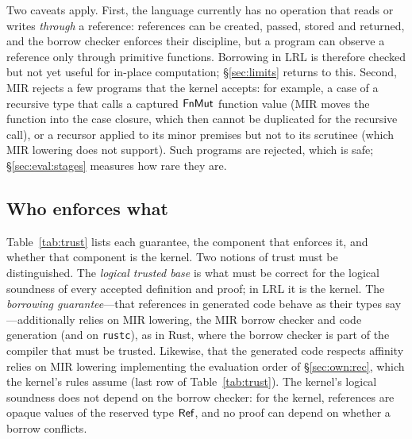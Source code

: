 Two caveats apply.
First, the language currently has no operation that reads or writes \emph{through} a reference: references can be created, passed, stored and returned, and the borrow checker enforces their discipline, but a program can observe a reference only through primitive functions.
Borrowing in LRL is therefore checked but not yet useful for in-place computation; \S\ref{sec:limits} returns to this.
Second, MIR rejects a few programs that the kernel accepts: for example, a case of a recursive type that calls a captured $\mathsf{FnMut}$ function value (MIR moves the function into the case closure, which then cannot be duplicated for the recursive call), or a recursor applied to its minor premises but not to its scrutinee (which MIR lowering does not support).
Such programs are rejected, which is safe; \S\ref{sec:eval:stages} measures how rare they are.

\subsection{Who enforces what}\label{sec:own:trust}

Table~\ref{tab:trust} lists each guarantee, the component that enforces it, and whether that component is the kernel.
Two notions of trust must be distinguished.
The \emph{logical trusted base} is what must be correct for the logical soundness of every accepted definition and proof; in LRL it is the kernel.
The \emph{borrowing guarantee}---that references in generated code behave as their types say---additionally relies on MIR lowering, the MIR borrow checker and code generation (and on \texttt{rustc}), as in Rust, where the borrow checker is part of the compiler that must be trusted.
Likewise, that the generated code respects affinity relies on MIR lowering implementing the evaluation order of \S\ref{sec:own:rec}, which the kernel's rules assume (last row of Table~\ref{tab:trust}).
The kernel's logical soundness does not depend on the borrow checker: for the kernel, references are opaque values of the reserved type $\mathsf{Ref}$, and no proof can depend on whether a borrow conflicts.

